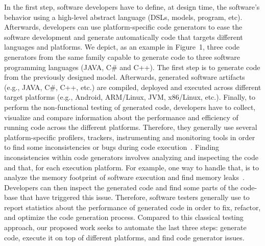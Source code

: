 In the first step, software developers have to define, at design time, the software's behavior using a high-level abstract language (DSLs, models, program, etc). Afterwards, developers can use platform-specific code generators to ease the software development and generate automatically code that targets different languages and platforms. We depict, as an example in Figure~1, three code generators from the same family capable to generate code to three software programming languages (JAVA, C\# and C++). The first step is to generate code from the previously designed model.
Afterwards, generated software artifacts (e.g., JAVA, C\#, C++, etc.) are compiled, deployed and executed across different target platforms (e.g., Android, ARM/Linux, JVM, x86/Linux, etc.). 
Finally, to perform the non-functional testing of generated code, developers have to collect, visualize and compare information about the performance and efficiency of running code across the different platforms. 
Therefore, they generally use several platform-specific profilers, trackers, instrumenting and monitoring tools in order to find some inconsistencies or bugs during code execution~\cite{guana2014chaintracker,delgado2004taxonomy}. Finding inconsistencies within code generators involves analyzing and inspecting the code and that, for each execution platform. For example, one way to handle that, is to analyze the memory footprint of software execution and find memory leaks~\cite{nethercote2007valgrind}. Developers can then inspect the generated code and find some parts of the code-base that have triggered this issue. %
Therefore, software testers generally use to report statistics about the performance of generated code in order to fix, refactor, and optimize the code generation process. Compared to this classical testing approach, our proposed work seeks to automate the last three steps: generate code, execute it on top of different platforms, and find code generator issues. 

